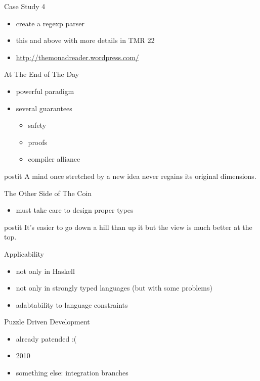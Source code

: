 \documentclass{beamer}
\renewcommand\quote[3]{
  \begin{beamercolorbox}[wd=\textwidth,rounded=true,shadow=true]{postit}
    #3
    \vskip5mm
    \hspace*\fill{\small{#1, \textit{#2}}}
  \end{beamercolorbox}
}
\begin{document}
\begin{frame}{Case Study 4}
  \begin{itemize}
    \item create a regexp parser
  \end{itemize}
  \pause
  \begin{itemize}
    \item this and above with more details in TMR 22
    \item \url{http://themonadreader.wordpress.com/}
  \end{itemize}
\end{frame}

\begin{frame}{At The End of The Day}
  \begin{itemize}
    \item powerful paradigm
    \item several guarantees
    \begin{itemize}
      \item safety
      \item proofs
      \item compiler alliance
    \end{itemize}
  \end{itemize}
  \pause
  \quote{-}{-}{A mind once stretched by a new idea never regains its original
  dimensions.}
\end{frame}

\begin{frame}{The Other Side of The Coin}
  \begin{itemize}
    \item must take care to design proper types
  \end{itemize}
  \pause
  \quote{Henry Ward Beecher}{-}{It's easier to go down a hill than up it but
  the view is much better at the top.}
\end{frame}

\begin{frame}{Applicability}
  \begin{itemize}[<+->]
    \item not only in Haskell
    \item not only in strongly typed languages (but with some problems)
    \item adabtability to language constraints
  \end{itemize}
\end{frame}

\begin{frame}{Puzzle Driven Development}
  \begin{itemize}[<+->]
    \item already patended :(
    \item 2010
    \item something else: integration branches
  \end{itemize}
\end{frame}
\end{document}
